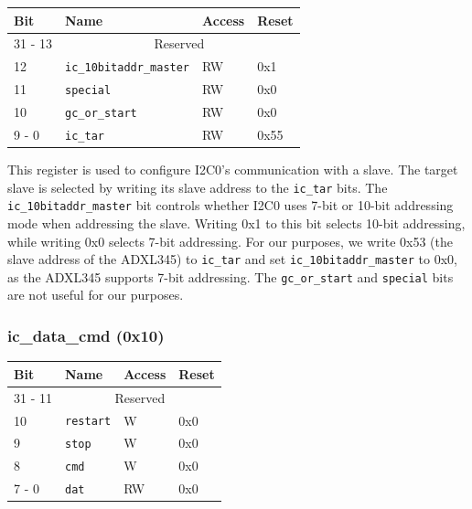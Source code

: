 \documentclass[11pt, twoside, pdftex]{article}
\begin{document}
\begin{table}[H]
    \centering
    \begin{tabular}{|l|l|l|l|}
        \hline
            \textbf{Bit}
            & \textbf{Name}
            & \textbf{Access}
            & \textbf{Reset}
        \\\hline
            31 - 13
            & \multicolumn{3}{|c|}{Reserved}
        \\\hline
            12
            & \texttt{ic\_10bitaddr\_master}
            & RW
            & 0x1
        \\\hline
            11
            & \texttt{special}
            & RW
            & 0x0
        \\\hline
            10
            & \texttt{gc\_or\_start}
            & RW
            & 0x0
        \\\hline
            9 - 0
            & \texttt{ic\_tar}
            & RW
            & 0x55
        \\\hline
    \end{tabular}
\end{table}

This register is used to configure I2C0's communication with a slave. The target slave is selected by writing its slave address to the \texttt{ic\_tar} bits. The \texttt{ic\_10bitaddr\_master} bit controls whether I2C0 uses 7-bit or 10-bit addressing mode when addressing the slave. Writing 0x1 to this bit selects 10-bit addressing, while writing 0x0 selects 7-bit addressing. For our purposes, we write 0x53 (the slave address of the ADXL345) to \texttt{ic\_tar} and set \texttt{ic\_10bitaddr\_master} to 0x0, as the ADXL345 supports 7-bit addressing. The \texttt{gc\_or\_start} and \texttt{special} bits are not useful for our purposes. 

\subsubsection{ic\_data\_cmd (0x10)}

\begin{table}[H]
    \centering
    \begin{tabular}{|l|l|l|l|}
        \hline
            \textbf{Bit}
            & \textbf{Name}
            & \textbf{Access}
            & \textbf{Reset}
        \\\hline
            31 - 11
            & \multicolumn{3}{|c|}{Reserved}
        \\\hline
            10
            & \texttt{restart}
            & W
            & 0x0
        \\\hline
            9
            & \texttt{stop}
            & W
            & 0x0
        \\\hline
            8
            & \texttt{cmd}
            & W
            & 0x0
        \\\hline
            7 - 0
            & \texttt{dat}
            & RW
            & 0x0
        \\\hline
    \end{tabular}
\end{table}
\end{document}
